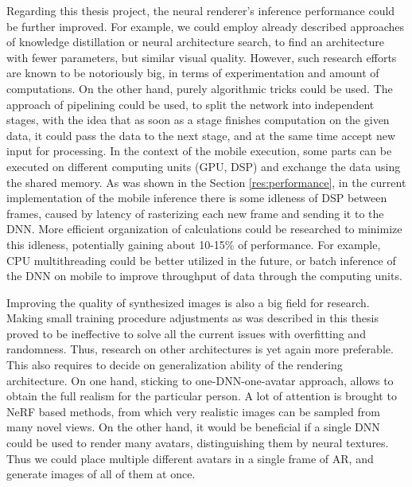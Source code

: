 Regarding this thesis project, the neural renderer's inference performance could be further improved. For example, we could employ already described approaches of knowledge distillation or neural architecture search, to find an architecture with fewer parameters, but similar visual quality. However, such research efforts are known to be notoriously big, in terms of experimentation and amount of computations. On the other hand, purely algorithmic tricks could be used. The approach of pipelining \cite{mobile:pipelining20} could be used, to split the network into independent stages, with the idea that as soon as a stage finishes computation on the given data, it could pass the data to the next stage, and at the same time accept new input for processing. In the context of the mobile execution, some parts can be executed on different computing units (GPU, DSP) and exchange the data using the shared memory. As was shown in the Section \ref{res:performance}, in the current implementation of the mobile inference there is some idleness of DSP between frames, caused by latency of rasterizing each new frame and sending it to the DNN. More efficient organization of calculations could be researched to minimize this idleness, potentially gaining about 10-15\% of performance. For example, CPU multithreading could be better utilized in the future, or batch inference of the DNN on mobile to improve throughput of data through the computing units.

Improving the quality of synthesized images is also a big field for research. Making small training procedure adjustments as was described in this thesis proved to be ineffective to solve all the current issues with overfitting and randomness. Thus, research on other architectures is yet again more preferable. This also requires to decide on generalization ability of the rendering architecture. On one hand, sticking to one-DNN-one-avatar approach, allows to obtain the full realism for the particular person. A lot of attention is brought to NeRF \cite{dnn:nerf20, dnn:phorhum22} based methods, from which very realistic images can be sampled from many novel views. On the other hand, it would be beneficial if a single DNN could be used to render many avatars, distinguishing them by neural textures. Thus we could place multiple different avatars in a single frame of AR, and generate images of all of them at once. 

